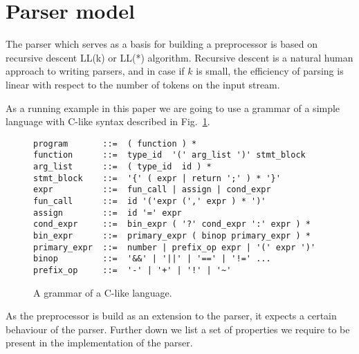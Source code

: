 \section{\label{sec:parser}Parser model}

The parser which serves as a basis for building a preprocessor is 
based on recursive descent LL(k) or LL(*) algorithm.  Recursive
descent is a natural human approach to writing parsers, and in
case if $k$ is small, the efficiency of parsing is linear with
respect to the number of tokens on the input stream. 

As a running example in this paper we are going to use a
grammar of a simple language with C-like syntax described in
Fig.~\ref{fig:grammar}.

\begin{figure}[h!]
\centering
\begin{verbatim}
program       ::=  ( function ) * 
function      ::=  type_id  '(' arg_list ')' stmt_block 
arg_list      ::=  ( type_id  id ) * 
stmt_block    ::=  '{' ( expr | return ';' ) * '}' 
expr          ::=  fun_call | assign | cond_expr 
fun_call      ::=  id '('expr (',' expr ) * ')' 
assign        ::=  id '=' expr 
cond_expr     ::=  bin_expr ( '?' cond_expr ':' expr ) * 
bin_expr      ::=  primary_expr ( binop primary_expr ) *
primary_expr  ::=  number | prefix_op expr | '(' expr ')' 
binop         ::=  '&&' | '||' | '==' | '!=' ... 
prefix_op     ::=  '-' | '+' | '!' | '~' 
\end{verbatim}
\caption{\label{fig:grammar}A grammar of a C-like language.}
\end{figure}

\noindent
As the preprocessor is build as an extension to the parser, 
it expects a certain behaviour of the parser.  Further down
we list a set of properties we require to be present in the 
implementation of the parser.

